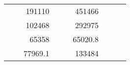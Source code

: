 \begin{table}[H]
\begin{tabular}{|ccrccrccc}
\multicolumn{1}{|c|}{\cellcolor[HTML]{FFFFC7}}                                & \multicolumn{1}{c|}{\cellcolor[HTML]{DDFDFF}}                      & \multicolumn{1}{r|}{\cellcolor[HTML]{DAE8FC}191110}    & \multicolumn{1}{c|}{\cellcolor[HTML]{FFFFC7}}                                & \multicolumn{1}{c|}{\cellcolor[HTML]{DDFDFF}}                       & \multicolumn{1}{r|}{\cellcolor[HTML]{DDFDFF}451466}    &                                                                              &                                                                    &                                                        \\ \cline{3-3} \cline{6-6}
\multicolumn{1}{|c|}{\cellcolor[HTML]{FFFFC7}}                                & \multicolumn{1}{c|}{\cellcolor[HTML]{DDFDFF}}                      & \multicolumn{1}{r|}{\cellcolor[HTML]{DDFDFF}102468}    & \multicolumn{1}{c|}{\cellcolor[HTML]{FFFFC7}}                                & \multicolumn{1}{c|}{\cellcolor[HTML]{DDFDFF}}                       & \multicolumn{1}{r|}{\cellcolor[HTML]{DAE8FC}292975}    &                                                                              &                                                                    &                                                        \\ \cline{3-3} \cline{6-6}
\multicolumn{1}{|c|}{\cellcolor[HTML]{FFFFC7}}                                & \multicolumn{1}{c|}{\cellcolor[HTML]{DDFDFF}}                      & \multicolumn{1}{r|}{\cellcolor[HTML]{DAE8FC}65358}     & \multicolumn{1}{c|}{\cellcolor[HTML]{FFFFC7}}                                & \multicolumn{1}{c|}{\cellcolor[HTML]{DDFDFF}}                       & \multicolumn{1}{r|}{\cellcolor[HTML]{DDFDFF}65020.8}   &                                                                              &                                                                    &                                                        \\ \cline{3-3} \cline{6-6}
\multicolumn{1}{|c|}{\cellcolor[HTML]{FFFFC7}}                                & \multicolumn{1}{c|}{\cellcolor[HTML]{DDFDFF}}                      & \multicolumn{1}{r|}{\cellcolor[HTML]{DDFDFF}77969.1}   & \multicolumn{1}{c|}{\cellcolor[HTML]{FFFFC7}}                                & \multicolumn{1}{c|}{\cellcolor[HTML]{DDFDFF}}                       & \multicolumn{1}{r|}{\cellcolor[HTML]{DAE8FC}133484}    &                                                                              &                                                                    &                                                        \\ \cline{3-3} \cline{6-6}

\end{tabular}
\end{table}
